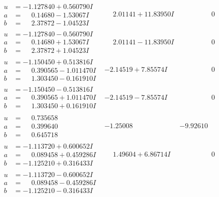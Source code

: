 \documentclass[1p]{elsarticle_modified}
\theoremstyle{definition}
\begin{document}
$$\begin{array}{c|c|c}
\begin{aligned}
u &= -1.127840 + 0.560790 I \\
a &= \phantom{-}0.14680 - 1.53067 I \\
b &= \phantom{-}2.37872 - 1.04523 I\end{aligned}
 & \phantom{-}2.01141 + 11.83950 I & \phantom{-0.000000 } 0 \\ \hline\begin{aligned}
u &= -1.127840 - 0.560790 I \\
a &= \phantom{-}0.14680 + 1.53067 I \\
b &= \phantom{-}2.37872 + 1.04523 I\end{aligned}
 & \phantom{-}2.01141 - 11.83950 I & \phantom{-0.000000 } 0 \\ \hline\begin{aligned}
u &= -1.150450 + 0.513816 I \\
a &= \phantom{-}0.390565 - 1.011470 I \\
b &= \phantom{-}1.303450 - 0.161910 I\end{aligned}
 & -2.14519 + 7.85574 I & \phantom{-0.000000 } 0 \\ \hline\begin{aligned}
u &= -1.150450 - 0.513816 I \\
a &= \phantom{-}0.390565 + 1.011470 I \\
b &= \phantom{-}1.303450 + 0.161910 I\end{aligned}
 & -2.14519 - 7.85574 I & \phantom{-0.000000 } 0 \\ \hline\begin{aligned}
u &= \phantom{-}0.735658\phantom{ +0.000000I} \\
a &= \phantom{-}0.399640\phantom{ +0.000000I} \\
b &= \phantom{-}0.645718\phantom{ +0.000000I}\end{aligned}
 & -1.25008\phantom{ +0.000000I} & -9.92610\phantom{ +0.000000I} \\ \hline\begin{aligned}
u &= -1.113720 + 0.600652 I \\
a &= \phantom{-}0.089458 + 0.459286 I \\
b &= -1.125210 + 0.316433 I\end{aligned}
 & \phantom{-}1.49604 + 6.86714 I & \phantom{-0.000000 } 0 \\ \hline\begin{aligned}
u &= -1.113720 - 0.600652 I \\
a &= \phantom{-}0.089458 - 0.459286 I \\
b &= -1.125210 - 0.316433 I\end{aligned}

\end{array}$$
\end{document}
